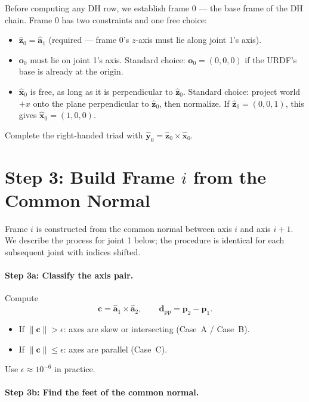 \documentclass[11pt]{article}
\newcommand{\vect}[1]{\bm{#1}}
\newcommand{\unit}[1]{\hat{\bm{#1}}}
\newcommand{\norm}[1]{\left\|#1\right\|}
\begin{document}
Before computing any DH row, we establish frame 0 --- the base frame of the
DH chain. Frame 0 has two constraints and one free choice:
\begin{itemize}
  \item $\unit{z}_0 = \unit{a}_1$ (required --- frame 0's $z$-axis must lie
        along joint 1's axis).
  \item $\vect{o}_0$ must lie on joint 1's axis. Standard choice:
        $\vect{o}_0 = (0, 0, 0)$ if the URDF's base is already at the origin.
  \item $\unit{x}_0$ is free, as long as it is perpendicular to $\unit{z}_0$.
        Standard choice: project world $+x$ onto the plane perpendicular to
        $\unit{z}_0$, then normalize. If $\unit{z}_0 = (0, 0, 1)$, this gives
        $\unit{x}_0 = (1, 0, 0)$.
\end{itemize}
Complete the right-handed triad with $\unit{y}_0 = \unit{z}_0 \times \unit{x}_0$.

\section{Step 3: Build Frame $i$ from the Common Normal}

Frame $i$ is constructed from the common normal between axis $i$ and axis
$i{+}1$. We describe the process for joint 1 below; the procedure is
identical for each subsequent joint with indices shifted.

\paragraph{Step 3a: Classify the axis pair.} Compute
\[
  \vect{c} = \unit{a}_1 \times \unit{a}_2,
  \qquad \vect{d}_{\mathrm{pp}} = \vect{p}_2 - \vect{p}_1.
\]
\begin{itemize}
  \item If $\norm{\vect{c}} > \epsilon$: axes are skew or intersecting
        (Case~A / Case~B).
  \item If $\norm{\vect{c}} \le \epsilon$: axes are parallel (Case~C).
\end{itemize}
Use $\epsilon \approx 10^{-6}$ in practice.

\paragraph{Step 3b: Find the feet of the common normal.}
\end{document}
